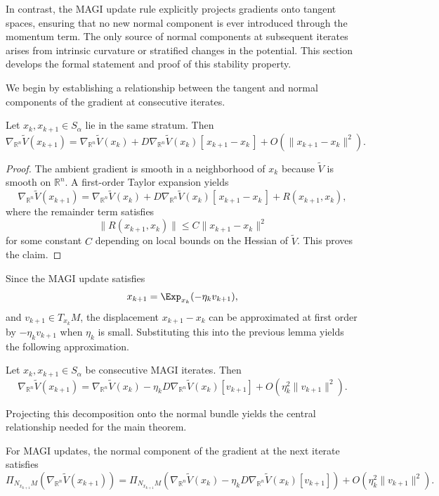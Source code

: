 \documentclass[12pt]{article}
\begin{document}
In contrast, the MAGI update rule explicitly projects gradients onto tangent spaces, ensuring that no new normal component is ever introduced through the momentum term. The only source of normal components at subsequent iterates arises from intrinsic curvature or stratified changes in the potential. This section develops the formal statement and proof of this stability property.

We begin by establishing a relationship between the tangent and normal components of the gradient at consecutive iterates.

\begin{lemma}
Let $x_k, x_{k+1} \in S_\alpha$ lie in the same stratum. Then
\[
\nabla_{\mathbb{R}^n} \widetilde{V}(x_{k+1})
=
\nabla_{\mathbb{R}^n} \widetilde{V}(x_k)
+
D\nabla_{\mathbb{R}^n} \widetilde{V}(x_k) [\, x_{k+1} - x_k \,] + O(\|x_{k+1} - x_k\|^2).
\]
\end{lemma}

\begin{proof}
The ambient gradient is smooth in a neighborhood of $x_k$ because $\widetilde{V}$ is smooth on $\mathbb{R}^n$. A first-order Taylor expansion yields
\[
\nabla_{\mathbb{R}^n} \widetilde{V}(x_{k+1})
=
\nabla_{\mathbb{R}^n} \widetilde{V}(x_k)
+
D\nabla_{\mathbb{R}^n} \widetilde{V}(x_k) [\, x_{k+1} - x_k \,]
+ R(x_{k+1},x_k),
\]
where the remainder term satisfies
\[
\|R(x_{k+1}, x_k)\| \le C \|x_{k+1}-x_k\|^2
\]
for some constant $C$ depending on local bounds on the Hessian of $\widetilde{V}$. This proves the claim.
\end{proof}

Since the MAGI update satisfies
\[
x_{k+1} = \Exp_{x_k}(-\eta_k v_{k+1}),
\]
and $v_{k+1} \in T_{x_k} M$, the displacement $x_{k+1} - x_k$ can be approximated at first order by $-\eta_k v_{k+1}$ when $\eta_k$ is small. Substituting this into the previous lemma yields the following approximation.

\begin{lemma}
Let $x_k, x_{k+1} \in S_\alpha$ be consecutive MAGI iterates. Then
\[
\nabla_{\mathbb{R}^n} \widetilde{V}(x_{k+1})
=
\nabla_{\mathbb{R}^n} \widetilde{V}(x_k)
-
\eta_k D\nabla_{\mathbb{R}^n} \widetilde{V}(x_k)[v_{k+1}]
+
O(\eta_k^2\|v_{k+1}\|^2).
\]
\end{lemma}

Projecting this decomposition onto the normal bundle yields the central relationship needed for the main theorem.

\begin{lemma}
For MAGI updates, the normal component of the gradient at the next iterate satisfies
\[
\Pi_{N_{x_{k+1}}M}(\nabla_{\mathbb{R}^n} \widetilde{V}(x_{k+1}))
=
\Pi_{N_{x_{k+1}}M}\!\left( \nabla_{\mathbb{R}^n} \widetilde{V}(x_k)
-
\eta_k D\nabla_{\mathbb{R}^n} \widetilde{V}(x_k)[v_{k+1}]  \right)
+
O(\eta_k^2\|v_{k+1}\|^2).
\]
\end{lemma}
\end{document}
